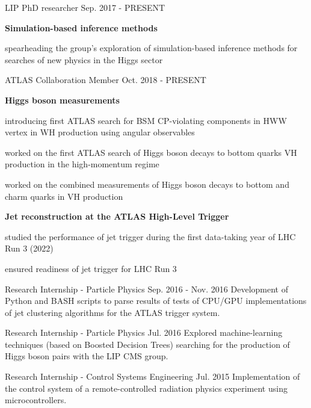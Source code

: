 
\begin{cventries}

    \cventry
    {LIP}
    {PhD researcher}
    {}
    {Sep. 2017 - PRESENT}
    {
        \textbf{Simulation-based inference methods}\vspace{12pt}
        \begin{cvitems}            
            \item {spearheading the group's exploration of simulation-based inference methods for searches of new physics in the Higgs sector}
        \end{cvitems}
    }

    \cventry
    {ATLAS Collaboration}
    {Member}
    {}
    {Oct. 2018 - PRESENT}
    {
        \textbf{Higgs boson measurements}\vspace{14pt}
        \begin{cvitems}
            \item {introducing first ATLAS search for BSM CP-violating components in HWW vertex in WH production using angular observables}
            \item {worked on the first ATLAS search of Higgs boson decays to bottom quarks VH production in the high-momentum regime}
            \item {worked on the combined measurements of Higgs boson decays to bottom and charm quarks in VH production}
        \end{cvitems}\vspace{19pt}
        \textbf{Jet reconstruction at the ATLAS High-Level Trigger}\vspace{14pt}
        \begin{cvitems}
            \item {studied the performance of jet trigger during the first data-taking year of LHC Run 3 (2022)}
            \item {ensured readiness of jet trigger for LHC Run 3}
        \end{cvitems}
    }

    {Research Internship - Particle Physics}
    {}
    {Sep. 2016 - Nov. 2016}
    {Development of Python and BASH scripts to parse results of tests of CPU/GPU implementations of jet clustering algorithms for the ATLAS trigger system.}

    {Research Internship - Particle Physics}
    {}
    {Jul. 2016}
    {Explored machine-learning techniques (based on Boosted Decision Trees) searching for the production of Higgs boson pairs with the LIP CMS group.}

    {Research Internship - Control Systems Engineering}
    {}
    {Jul. 2015}
    {Implementation of the control system of a remote-controlled radiation physics experiment using microcontrollers.}

\end{cventries}